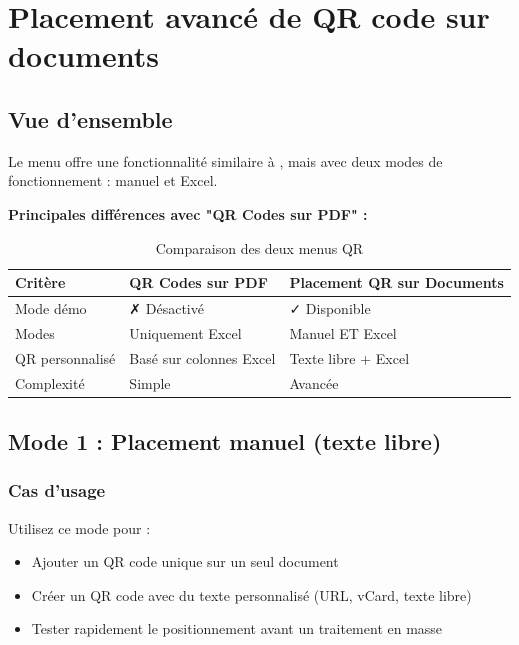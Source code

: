 \section{Placement avancé de QR code sur documents}

\subsection{Vue d'ensemble}

Le menu  offre une fonctionnalité similaire à , mais avec deux modes de fonctionnement : manuel et Excel.


\textbf{Principales différences avec "QR Codes sur PDF" :}

\begin{table}[h]
\centering
\begin{tabular}{|l|p{5cm}|p{5cm}|}
\hline
\textbf{Critère} & \textbf{QR Codes sur PDF} & \textbf{Placement QR sur Documents} \\
\hline
Mode démo & ✗ Désactivé & ✓ Disponible \\
\hline
Modes & Uniquement Excel & Manuel ET Excel \\
\hline
QR personnalisé & Basé sur colonnes Excel & Texte libre + Excel \\
\hline
Complexité & Simple & Avancée \\
\hline
\end{tabular}
\caption{Comparaison des deux menus QR}
\end{table}

\subsection{Mode 1 : Placement manuel (texte libre)}

\subsubsection{Cas d'usage}

Utilisez ce mode pour :
\begin{itemize}[leftmargin=*]
    \item Ajouter un QR code unique sur un seul document
    \item Créer un QR code avec du texte personnalisé (URL, vCard, texte libre)
    \item Tester rapidement le positionnement avant un traitement en masse
\end{itemize}

